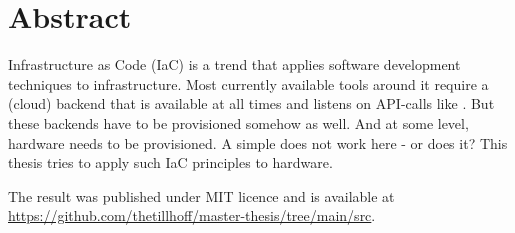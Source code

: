 \titlespacing*{\chapter}{170pt}{0pt}{10pt} %

\chapter*{Abstract}
\begin{addmargin}[2em]{2em}
Infrastructure as Code (IaC) is a trend that applies software development techniques to infrastructure. Most currently available tools around it require a (cloud) backend that is available at all times and listens on API-calls like . But these backends have to be provisioned somehow as well. And at some level, hardware needs to be provisioned. A simple  does not work here - or does it? This thesis tries to apply such IaC principles to hardware.

\end{addmargin}

\bigskip
\begin{addmargin}[2em]{2em}
The result was published under MIT licence and is available at \\
\url{https://github.com/thetillhoff/master-thesis/tree/main/src}.
\end{addmargin}


\titlespacing*{\chapter}{0pt}{0pt}{10pt} %
